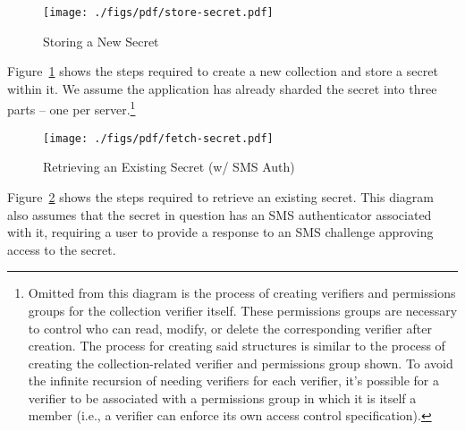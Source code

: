 \begin{figure}[th]
  \centering
  \texttt{[image: ./figs/pdf/store-secret.pdf]}
  \caption{Storing a New Secret}
  \label{fig:tutamen:storesecret}
\end{figure}

Figure~\ref{fig:tutamen:storesecret} shows the steps required to
create a new collection and store a secret within it. We assume the
application has already sharded the secret into three parts -- one per
server.\footnote{Omitted from this diagram is the process of creating
  verifiers and permissions groups for the collection verifier
  itself. These permissions groups are necessary to control who can
  read, modify, or delete the corresponding verifier after
  creation. The process for creating said structures is similar to the
  process of creating the collection-related verifier and permissions
  group shown. To avoid the infinite recursion of needing verifiers
  for each verifier, it's possible for a verifier to be associated
  with a permissions group in which it is itself a member (i.e., a
  verifier can enforce its own access control specification).}

\begin{figure}[th]
  \centering
  \texttt{[image: ./figs/pdf/fetch-secret.pdf]}
  \caption{Retrieving an Existing Secret (w/ SMS Auth)}
  \label{fig:tutamen:fetchsecret}
\end{figure}

Figure~\ref{fig:tutamen:fetchsecret} shows the steps required to
retrieve an existing secret. This diagram also assumes that the secret
in question has an SMS authenticator associated with it, requiring a
user to provide a response to an SMS challenge approving access to the
secret.

